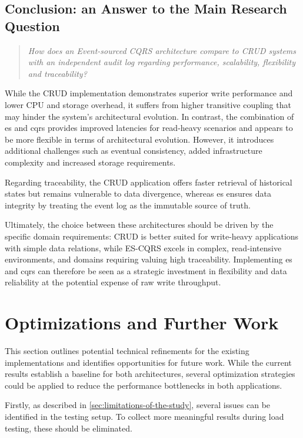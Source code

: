 \subsection{Conclusion: an Answer to the Main Research Question}

\begin{quote}
    \textit{How does an Event-sourced CQRS architecture compare to CRUD systems with an independent audit log regarding performance, scalability, flexibility and traceability?}
\end{quote}

While the CRUD implementation demonstrates superior write performance and lower CPU and storage overhead, it suffers from higher transitive coupling that may hinder the system's architectural evolution. In contrast, the combination of \gls{es} and \gls{cqrs} provides improved latencies for read-heavy scenarios and appears to be more flexible in terms of architectural evolution. However, it introduces additional challenges such as eventual consistency, added infrastructure complexity and increased storage requirements.

Regarding traceability, the CRUD application offers faster retrieval of historical states but remains vulnerable to data divergence, whereas \acrlong{es} ensures data integrity by treating the event log as the immutable source of truth.

Ultimately, the choice between these architectures should be driven by the specific domain requirements: CRUD is better suited for write-heavy applications with simple data relations, while ES-CQRS excels in complex, read-intensive environments, and domains requiring valuing high traceability. Implementing \acrlong{es} and \gls{cqrs} can therefore be seen as a strategic investment in flexibility and data reliability at the potential expense of raw write throughput.

\section{Optimizations and Further Work}
\label{sec:optimizations-and-further-work}

This section outlines potential technical refinements for the existing implementations and identifies opportunities for future work. While the current results establish a baseline for both architectures, several optimization strategies could be applied to reduce the performance bottlenecks in both applications.

Firstly, as described in \autoref{sec:limitations-of-the-study}, several issues can be identified in the testing setup. To collect more meaningful results during load testing, these should be eliminated.

